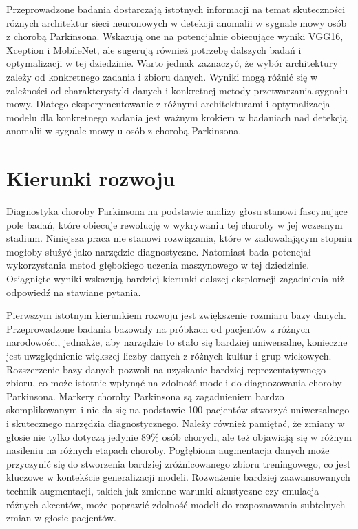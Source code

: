 Przeprowadzone badania dostarczają istotnych informacji na temat skuteczności różnych architektur sieci neuronowych w detekcji anomalii w sygnale mowy osób z chorobą Parkinsona.
Wskazują one na potencjalnie obiecujące wyniki VGG16, Xception i MobileNet, ale sugerują również potrzebę dalszych badań i optymalizacji w tej dziedzinie.
Warto jednak zaznaczyć, że wybór architektury zależy od konkretnego zadania i zbioru danych.
Wyniki mogą różnić się w zależności od charakterystyki danych i konkretnej metody przetwarzania sygnału mowy.
Dlatego eksperymentowanie z różnymi architekturami i optymalizacja modelu dla konkretnego zadania jest ważnym krokiem w badaniach nad detekcją anomalii w sygnale mowy u osób z chorobą Parkinsona.

\section{Kierunki rozwoju}
\label{sec:kierunki-rozwoju}

Diagnostyka choroby Parkinsona na podstawie analizy głosu stanowi fascynujące pole badań, które obiecuje rewolucję w wykrywaniu tej choroby w jej wczesnym stadium.
Niniejsza praca nie stanowi rozwiązania, które w zadowalającym stopniu mogłoby służyć jako narzędzie diagnostyczne.
Natomiast bada potencjał wykorzystania metod głębokiego uczenia maszynowego w tej dziedzinie.
Osiągnięte wyniki wskazują bardziej kierunki dalszej eksploracji zagadnienia niż odpowiedź na stawiane pytania.

Pierwszym istotnym kierunkiem rozwoju jest zwiększenie rozmiaru bazy danych.
Przeprowadzone badania bazowały na próbkach od pacjentów z różnych narodowości, jednakże, aby narzędzie to stało się bardziej uniwersalne, konieczne jest uwzględnienie większej liczby danych z różnych kultur i grup wiekowych.
Rozszerzenie bazy danych pozwoli na uzyskanie bardziej reprezentatywnego zbioru, co może istotnie wpłynąć na zdolność modeli do diagnozowania choroby Parkinsona.
Markery choroby Parkinsona są zagadnieniem bardzo skomplikowanym i nie da się na podstawie 100 pacjentów stworzyć uniwersalnego i skutecznego narzędzia diagnostycznego.
Należy również pamiętać, że zmiany w głosie nie tylko dotyczą jedynie 89\% osób chorych, ale też objawiają się w różnym nasileniu na różnych etapach choroby.
Pogłębiona augmentacja danych może przyczynić się do stworzenia bardziej zróżnicowanego zbioru treningowego, co jest kluczowe w kontekście generalizacji modeli.
Rozważenie bardziej zaawansowanych technik augmentacji, takich jak zmienne warunki akustyczne czy emulacja różnych akcentów, może poprawić zdolność modeli do rozpoznawania subtelnych zmian w głosie pacjentów.

